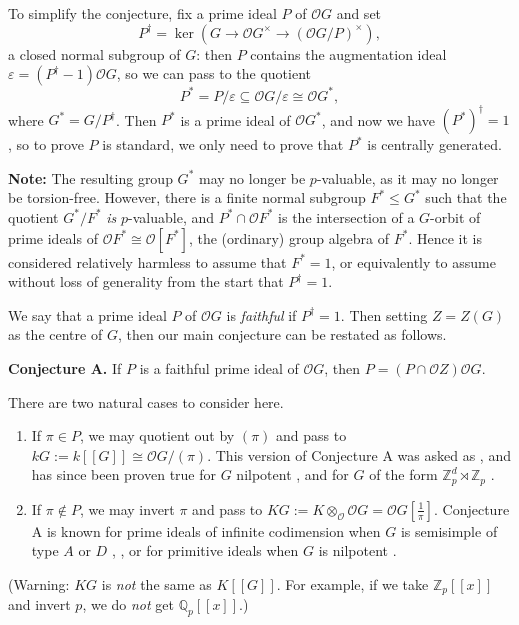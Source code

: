 \documentclass[12pt,a4paper]{article}
\theoremstyle{definition}
\theoremstyle{remark}
\theoremstyle{custthm}
\renewcommand{\O}{\mathcal{O}}
\begin{document}
To simplify the conjecture, fix a prime ideal $P$ of $\O G$ and set $$P^\dagger = \ker(G\to \O G^\times\to (\O G/P)^\times),$$ a closed normal subgroup of $G$: then $P$ contains the augmentation ideal $\varepsilon = (P^\dagger - 1)\O G$, so we can pass to the quotient $$P^* = P/\varepsilon \subseteq \O G/\varepsilon \cong \O G^*,$$ where $G^* = G/P^\dagger$. Then $P^*$ is a prime ideal of $\O G^*$, and now we have $(P^*)^\dagger = 1$, so to prove $P$ is standard, we only need to prove that $P^*$ is centrally generated.

\textbf{Note:} The resulting group $G^*$ may no longer be $p$-valuable, as it may no longer be torsion-free. However, there is a finite normal subgroup $F^* \leq G^*$ such that the quotient $G^*/F^*$ \emph{is} $p$-valuable, and $P^* \cap \O F^*$ is the intersection of a $G$-orbit of prime ideals of $\O F^* \cong \O[F^*]$, the (ordinary) group algebra of $F^*$. Hence it is considered relatively harmless to assume that $F^* = 1$, or equivalently to assume without loss of generality from the start that $P^\dagger = 1$.

We say that a prime ideal $P$ of $\O G$ is \emph{faithful} if $P^\dagger=1$. Then setting $Z=Z(G)$ as the centre of $G$, then our main conjecture can be restated as follows.

\textbf{Conjecture A.} If $P$ is a faithful prime ideal of $\O G$, then $P = (P\cap \O Z)\O G$.

There are two natural cases to consider here.

\begin{enumerate}
\item If $\pi\in P$, we may quotient out by $(\pi)$ and pass to $kG := k[[G]] \cong \O G/(\pi)$. This version of Conjecture A was asked as \cite[Question O]{ArdBro06}, and has since been proven true for $G$ nilpotent \cite[Theorem 8.4]{ardakovInv}, and for $G$ of the form $\mathbb{Z}_p^d\rtimes\mathbb{Z}_p$ \cite[Theorem 1.4]{jones-abelian-by-procyclic}.
\item If $\pi\not\in P$, we may invert $\pi$ and pass to $KG :=K\otimes_\O \O G= \O G[\frac{1}{\pi}]$. Conjecture A is known for prime ideals of infinite codimension when $G$ is semisimple of type $A$ or $D$ \cite[Theorem 3]{Mann}, \cite[Theorem 2]{Mann2}, or for primitive ideals when $G$ is nilpotent \cite[Theorem A]{jones-primitive-ideals}.
\end{enumerate}

(Warning: $KG$ is \emph{not} the same as $K[[G]]$. For example, if we take $\mathbb{Z}_p[[x]]$ and invert $p$, we do \emph{not} get $\mathbb{Q}_p[[x]]$.)
\end{document}
